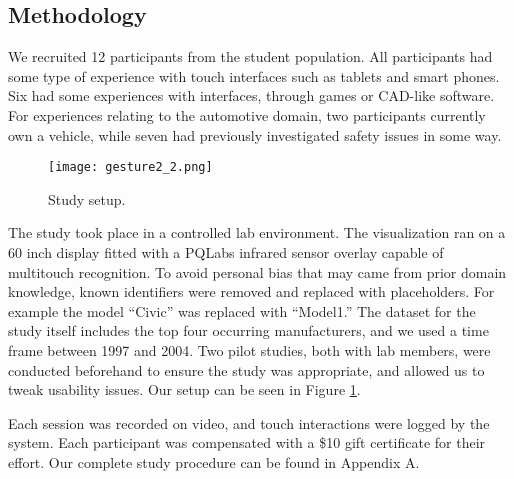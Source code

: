 

\subsection{Methodology}
We recruited 12 participants from the student population. All participants had some
type of experience with touch interfaces such as tablets and smart phones. Six 
had some experiences with \threed interfaces, through games or CAD-like
software. For experiences relating to the automotive domain, two participants
currently own a vehicle, while seven had previously investigated safety issues in
some way. 
 
	\begin{figure}
	 \centering  
	 \texttt{[image: gesture2\_2.png]}  
	 \caption{Study setup.}
	 \label{figure:study}
	\end{figure}


The study took place in a controlled lab environment. The visualization ran on
a 60 inch display fitted with a PQLabs infrared sensor overlay capable of
multitouch recognition. To avoid personal bias that may came from prior domain
knowledge, known identifiers were removed and replaced with placeholders.
For example the model ``Civic'' was replaced with ``Model1.'' The dataset for
the study itself includes the top four occurring manufacturers, and we used a time
frame between 1997 and 2004. Two pilot studies, both with lab members, were
conducted beforehand to ensure the study was appropriate, and allowed us to
tweak usability issues. Our setup can be seen in Figure \ref{figure:study}.

Each session was recorded on video, and touch interactions were
logged by the system. Each participant was compensated with a \$10 gift
certificate for their effort. Our complete study procedure can be found in Appendix A.


